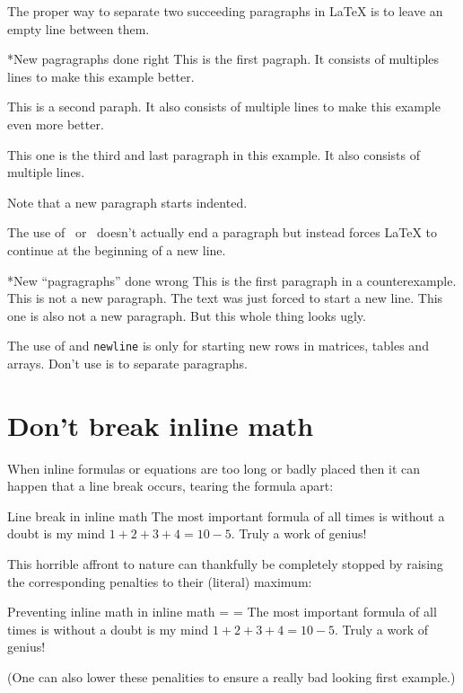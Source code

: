 The proper way to separate two succeeding paragraphs in {\LaTeX} is to leave an empty line between them.
\begin{showlatex}*{New pagragraphs done right}
This is the first pagraph.
It consists of multiples lines to make this example better.

This is a second paraph.
It also consists of multiple lines to make this example even more better.

This one is the third and last paragraph in this example.
It also consists of multiple lines.
\end{showlatex}
Note that a new paragraph starts indented.

The use of~\commandname{\tbs} or~ doesn’t actually end a paragraph but instead forces {\LaTeX} to continue at the beginning of a new line.
\begin{showlatex}*{New \enquote{pagragraphs} done wrong}
This is the first paragraph in a counterexample.\\
This is not a new paragraph.
The text was just forced to start a new line.\newline
This one is also not a new paragraph.
But this whole thing looks ugly.
\end{showlatex}
The use of \texttt{\tbs\tbs} and \texttt{{\tbs}newline} is only for starting new rows in matrices, tables and arrays.
Don’t use is to separate paragraphs.





\section{Don’t break inline math}
\label{breaking inline math}

When inline formulas or equations are too long or badly placed then it can happen that a line break occurs, tearing the formula apart:
\begin{showlatex}[before lower = {\binoppenalty=100}, after lower = {\binoppenalty = \maxdimen}]{Line break in inline math}
The most important formula of all times is without a doubt is my mind $1 + 2 + 3 + 4 = 10 - 5$.
Truly a work of genius!
\end{showlatex}
This horrible affront to nature can thankfully be completely stopped by raising the corresponding penalties to their (literal) maximum:
\begin{showlatex}{Preventing inline math in inline math}
\binoppenalty = \maxdimen
\relpenalty = \maxdimen
The most important formula of all times is without a doubt is my mind $1 + 2 + 3 + 4 = 10 - 5$.
Truly a work of genius!
\end{showlatex}
(One can also lower these penalities to ensure a really bad looking first example.)





